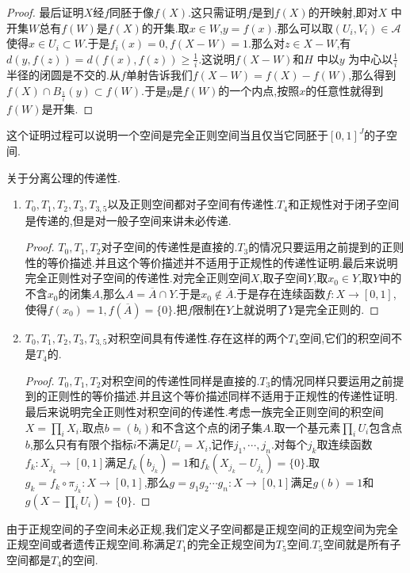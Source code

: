 \begin{proof}
最后证明$X$经$f$同胚于像$f(X)$.这只需证明$f$是到$f(X)$的开映射,即对$X$ 中开集$W$总有$f(W)$是$f(X)$的开集.取$x\in W$,$y=f(x)$.那么可以取$(U_i,V_i)\in\mathscr{A}$使得$x\in U_i\subset W$.于是$f_i(x)=0,f(X-W)=1$.那么对$z\in X-W$,有$d(y,f(z))=d(f(x),f(z))\ge\frac{1}{i}$.这说明$f(X-W)$和$H$ 中以$y$ 为中心以$\frac{1}{i}$半径的闭圆是不交的.从$f$单射告诉我们$f(X-W)=f(X)-f(W)$,那么得到$f(X)\cap B_{\frac{1}{i}}(y)\subset f(W)$.于是$y$是$f(W)$的一个内点,按照$x$的任意性就得到$f(W)$是开集.
\end{proof}

这个证明过程可以说明一个空间是完全正则空间当且仅当它同胚于$[0,1]^J$的子空间.

关于分离公理的传递性.
\begin{enumerate}
	\item $T_0,T_1,T_2,T_3,T_{3,5}$以及正则空间都对子空间有传递性.$T_4$和正规性对于闭子空间是传递的,但是对一般子空间来讲未必传递.
	\begin{proof}
		
		$T_0,T_1,T_2$对子空间的传递性是直接的.$T_3$的情况只要运用之前提到的正则性的等价描述.并且这个等价描述并不适用于正规性的传递性证明.最后来说明完全正则性对子空间的传递性.对完全正则空间$X$,取子空间$Y$,取$x_0\in Y$,取$Y$中的不含$x_0$的闭集$A$,那么$A=\overline{A}\cap Y$.于是$x_0\not\in\overline{A}$.于是存在连续函数$f:X\to[0,1]$,使得$f(x_0)=1,f(\overline{A})=\{0\}$.把$f$限制在$Y$上就说明了$Y$是完全正则的.
	\end{proof}
	\item $T_0,T_1,T_2,T_3,T_{3,5}$对积空间具有传递性.存在这样的两个$T_4$空间,它们的积空间不是$T_4$的.
	\begin{proof}
		
		$T_0,T_1,T_2$对积空间的传递性同样是直接的.$T_3$的情况同样只要运用之前提到的正则性的等价描述.并且这个等价描述同样不适用于正规性的传递性证明.最后来说明完全正则性对积空间的传递性.考虑一族完全正则空间的积空间$X=\prod_iX_i$.取点$b=(b_i)$和不含这个点的闭子集$A$.取一个基元素$\prod_iU_i$包含点$b$,那么只有有限个指标$i$不满足$U_i=X_i$,记作$j_1,\cdots,j_n$.对每个$j_k$取连续函数$f_k:X_{j_k}\to[0,1]$满足$f_k(b_{j_k})=1$和$f_k(X_{j_k}-U_{j_k})=\{0\}$.取$g_k=f_k\circ\pi_{j_k}:X\to[0,1]$,那么$g=g_1g_2\cdots g_n:X\to[0,1]$满足$g(b)=1$和$g(X-\prod_i U_i)=\{0\}$.
	\end{proof}
\end{enumerate}

由于正规空间的子空间未必正规,我们定义子空间都是正规空间的正规空间为完全正规空间或者遗传正规空间.称满足$T_1$的完全正规空间为$T_5$空间.$T_5$空间就是所有子空间都是$T_4$的空间.

